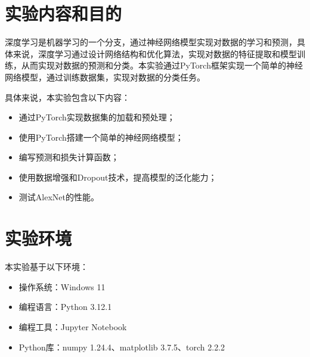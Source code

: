 \section{实验内容和目的}

深度学习是机器学习的一个分支，通过神经网络模型实现对数据的学习和预测，具体来说，深度学习通过设计网络结构和优化算法，实现对数据的特征提取和模型训练，从而实现对数据的预测和分类。本实验通过PyTorch框架实现一个简单的神经网络模型，通过训练数据集，实现对数据的分类任务。

具体来说，本实验包含以下内容：

\begin{itemize}
    \item 通过PyTorch实现数据集的加载和预处理；
    \item 使用PyTorch搭建一个简单的神经网络模型；
    \item 编写预测和损失计算函数；
    \item 使用数据增强和Dropout技术，提高模型的泛化能力；
    \item 测试AlexNet的性能。
\end{itemize}

\section{实验环境}

本实验基于以下环境：

\begin{itemize}
    \item 操作系统：Windows 11
    \item 编程语言：Python 3.12.1
    \item 编程工具：Jupyter Notebook
    \item Python库：numpy 1.24.4、matplotlib 3.7.5、torch 2.2.2
\end{itemize}
